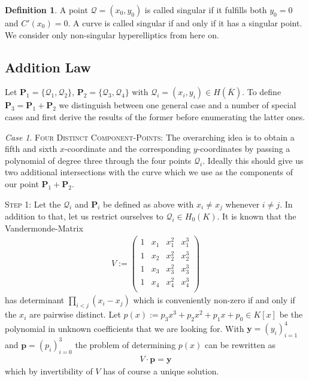 \documentclass[english,11pt,a4paper]{article}
\theoremstyle{definition}
\newtheorem{defin}{Definition}
\theoremstyle{remark}
\theoremstyle{case}
\newtheorem{case}{Case}
\renewcommand{\P}{\mathbf{P}}
\newcommand{\q}{\mathcal{Q}}
\renewcommand{\bar}{\overline}
\newcommand{\ekb}{H(\bar K)}
\newcommand{\enk}{H_0(K)}
\begin{document}
\begin{defin}
	A point $\q = (x_0,y_0)$ is called singular if it fulfills both $y_0=0$ and $C'(x_0) = 0$. A curve is called singular if and only if it has a singular point. We consider only non-singular hyperelliptics from here on.
\end{defin}


\subsection{Addition Law}

Let $\P_1 = \{\q_1,\q_2\}$, $\P_2 = \{\q_3,\q_4\}$ with $\q_i = (x_i,y_i) \in \ekb$. To define $\P_3 = \P_1 + \P_2$ we distinguish between one general case and a number of special cases and first derive the results of the former before enumerating the latter ones.

\begin{case} {\scshape Four Distinct Component-Points:}
	The overarching idea is to obtain a fifth and sixth $x$-coordinate and the corresponding $y$-coordinates by passing a polynomial of degree three through the four points $\q_i$. Ideally this should give us two additional intersections with the curve which we use as the components of our point $\P_1 + \P_2$.

	{\scshape Step 1:} Let the $\q_i$ and $\P_i$ be defined as above with $x_i \neq x_j$ whenever $i \neq j$. In addition to that, let us restrict ourselves to $\q_i \in \enk$. It is known that the Vandermonde-Matrix
	\begin{align*}V:=
		\begin{pmatrix}
			1 & x_1 & x_1^2 & x_1^3\\
			1 & x_2 & x_2^2 & x_2^3\\
			1 & x_3 & x_3^2 & x_3^3\\
			1 & x_4 & x_4^2 & x_4^3\\
		\end{pmatrix}
	\end{align*}
	has determinant $\prod_{i < j} (x_i-x_j)$ which is conveniently non-zero if and only if the $x_i$ are pairwise distinct. Let $p(x) := p_3 x^3 + p_2 x^2 + p_1 x + p_0 \in K[x]$ be the polynomial in unknown coefficients that we are looking for. With $\textbf{y} = (y_i)_{i=1}^4$ and $\textbf{p} = (p_i)_{i=0}^3$ the problem of determining $p(x)$ can be rewritten as
	\begin{align*}
		V \cdot \mathbf{p} = \mathbf{y}
	\end{align*}
	which by invertibility of $V$ has of course a unique solution.


\end{case}
\end{document}
